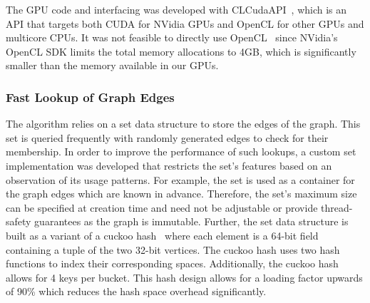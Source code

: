 \begin{comment}
\textit{\bf !!! Remove the history approach !!!}
Initially, the system was developed using OpenCL~\cite{opencl} in order to
accelerate the computations of the algorithm. OpenCL was chosen as it provides
a common abstraction for a variety of compute devices.
However, NVidia's OpenCL SDK limits the
total memory allocations within a context to 4GB which severely limits the
problem sizes that can be tackled on GPUs. Therefore, we migrated the system to
use the abstraction layer CLCudaAPI~\cite{claduc}
to support both OpenCL and CUDA~\cite{Nickolls:2008:SPP:1365490.1365500}
as back-ends.
%
CLCudaAPI
hides the difference between OpenCL and the CUDA driver API.
For example, the library provides abstractions for Device, Context, Queue and
Buffer. Additionally, the implementations use a combination of inline functions
and preprocessor macros to abstract away the differences between OpenCL's and
CUDA's primitive types, address spaces and functions.
\end{comment}
The GPU code and interfacing was developed with CLCudaAPI~\cite{claduc}, which
is an API that targets both CUDA for NVidia GPUs and OpenCL for other GPUs and
multicore CPUs. It was not feasible to directly use OpenCL~\cite{opencl} since
NVidia's OpenCL SDK limits the total memory allocations to 4GB, which is
significantly smaller than the memory available in our GPUs.

\subsubsection{Fast Lookup of Graph Edges}

The algorithm relies on a set data structure to store the edges of the graph.
This set is queried frequently with randomly generated edges to check for their
membership. In order to improve the performance of such lookups, a custom set
implementation was developed that restricts the set's features based on an
observation of its usage patterns. For example, the set is used as a container
for the graph edges which are known in advance. Therefore, the set's maximum
size can be specified at creation time and need not be adjustable or provide
thread-safety guarantees as the graph is immutable. Further, the set data
structure is built as a variant of a cuckoo
hash~\cite{Pagh:2004:CH:1006424.1006426} where each element is a 64-bit
field containing a tuple of the two 32-bit vertices. The cuckoo hash
uses two hash functions to index their corresponding spaces. Additionally, the
cuckoo hash allows for 4 keys per bucket. This hash design allows for a loading
factor upwards of 90\% which reduces the hash space overhead
significantly.

